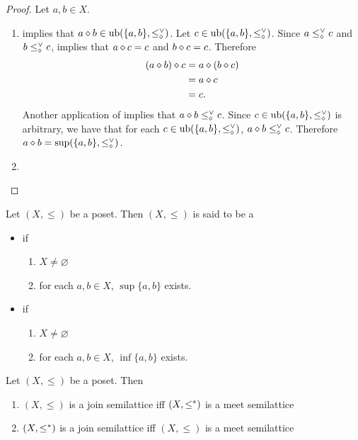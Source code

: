 \documentclass{book}
\begin{document}
	\begin{proof} 
		Let $a,b \in X$.
		\begin{enumerate}
			\item 
			 implies that $a \diamond b \in \operatorname{ub}( \{a,b\}, \leq_{\diamond}^{\vee})$. Let $c \in \operatorname{ub}( \{a,b\}, \leq_{\diamond}^{\vee})$. Since $a \leq_{\diamond}^{\vee} c$ and $b \leq_{\diamond}^{\vee} c$,  implies that $a \diamond c = c$ and $b \diamond c = c$. Therefore 
			\begin{align*}
				(a \diamond b) \diamond c 
				& = a \diamond (b \diamond c) \\
				& = a \diamond c \\
				& = c.
			\end{align*}
			Another application of  implies that $a \diamond b \leq_{\diamond}^{\vee} c$. Since $c \in \operatorname{ub}( \{a,b\}, \leq_{\diamond}^{\vee})$ is arbitrary, we have that for each $c \in \operatorname{ub}( \{a,b\}, \leq_{\diamond}^{\vee})$, $a \diamond b \leq_{\diamond}^{\vee} c$. Therefore $a \diamond b = \sup( \{a,b\}, \leq_{\diamond}^{\vee})$.
			\item {}
		\end{enumerate}
	\end{proof}
	
	\begin{defn} 
		Let $(X, \leq)$ be a poset. Then $(X, \leq)$ is said to be a
		\begin{itemize}
			\item {} if 
			\begin{enumerate}
				\item $X \neq \varnothing$
				\item for each $a,b \in X$, $\sup \{a,b\}$ exists. 
			\end{enumerate}
			\item {} if 
			\begin{enumerate}
				\item $X \neq \varnothing$
				\item for each $a,b \in X$, $\inf \{a,b\}$ exists. 
			\end{enumerate}
		\end{itemize}
	\end{defn}
	
	\begin{ex} 
		Let $(X, \leq)$ be a poset. Then 
		\begin{enumerate}
			\item $(X, \leq)$ is a join semilattice iff $(X, \leq^*)$ is a meet semilattice
			\item $(X, \leq^*)$ is a join semilattice iff $(X, \leq)$ is a meet semilattice
		\end{enumerate}
	\end{ex}
	
\end{document}
